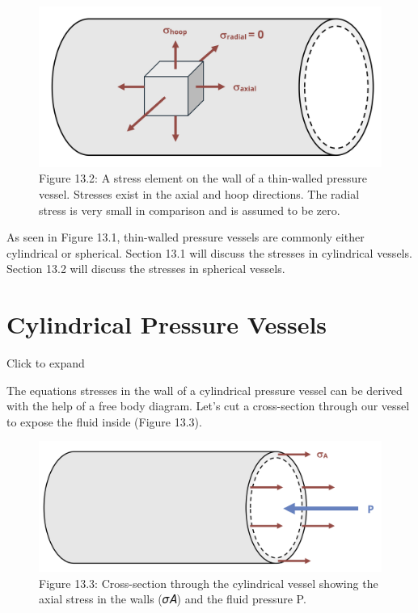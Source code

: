 \documentclass[
  letterpaper,
  DIV=11,
  numbers=noendperiod]{scrreprt}
\theoremstyle{definition}
\theoremstyle{remark}
\begin{document}
\begin{figure}[H]

{\centering \includegraphics[width=5.26042in,height=\textheight]{images/CH13 PNGs/figure 13.2.png}

}

\caption{Figure 13.2: A stress element on the wall of a thin-walled
pressure vessel. Stresses exist in the axial and hoop directions. The
radial stress is very small in comparison and is assumed to be zero.}

\end{figure}%

As seen in Figure 13.1, thin-walled pressure vessels are commonly either
cylindrical or spherical. Section 13.1 will discuss the stresses in
cylindrical vessels. Section 13.2 will discuss the stresses in spherical
vessels.

\section{Cylindrical Pressure Vessels}\label{sec-13.1}

Click to expand

The equations stresses in the wall of a cylindrical pressure vessel can
be derived with the help of a free body diagram. Let's cut a
cross-section through our vessel to expose the fluid inside (Figure
13.3).

\begin{figure}[H]

{\centering \includegraphics[width=6.22917in,height=\textheight]{images/CH13 PNGs/figure 13.3.png}

}

\caption{Figure 13.3: Cross-section through the cylindrical vessel
showing the axial stress in the walls (𝜎𝐴) and the fluid pressure P.}

\end{figure}%
\end{document}

